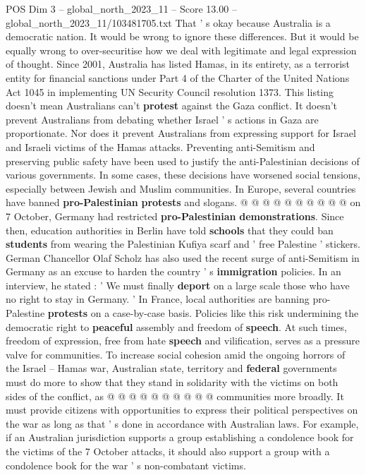 \begin{textsample}{POS Dim 3 – global\_north\_2023\_11 – Score 13.00 – global\_north\_2023\_11/103481705.txt}
That ' s okay because Australia is a democratic nation.
It would be wrong to ignore these differences.
But it would be equally wrong to over-securitise how we deal with legitimate and legal expression of thought.
Since 2001, Australia has listed Hamas, in its entirety, as a terrorist entity for financial sanctions under Part 4 of the Charter of the United Nations Act 1045 in implementing UN Security Council resolution 1373.
This listing doesn't mean Australians can't \textbf{protest} against the Gaza conflict.
It doesn't prevent Australians from debating whether Israel ' s actions in Gaza are proportionate.
Nor does it prevent Australians from expressing support for Israel and Israeli victims of the Hamas attacks.
Preventing anti-Semitism and preserving public safety have been used to justify the anti-Palestinian decisions of various governments.
In some cases, these decisions have worsened social tensions, especially between Jewish and Muslim communities.
In Europe, several countries have banned \textbf{pro-Palestinian} \textbf{protests} and slogans. @ @ @ @ @ @ @ @ @ @ on 7 October, Germany had restricted \textbf{pro-Palestinian} \textbf{demonstrations}.
Since then, education authorities in Berlin have told \textbf{schools} that they could ban \textbf{students} from wearing the Palestinian Kufiya scarf and ' free Palestine ' stickers.
German Chancellor Olaf Scholz has also used the recent surge of anti-Semitism in Germany as an excuse to harden the country ' s \textbf{immigration} policies.
In an interview, he stated : ' We must finally \textbf{deport} on a large scale those who have no right to stay in Germany. ' In France, local authorities are banning pro-Palestine \textbf{protests} on a case-by-case basis.
Policies like this risk undermining the democratic right to \textbf{peaceful} assembly and freedom of \textbf{speech}.
At such times, freedom of expression, free from hate \textbf{speech} and vilification, serves as a pressure valve for communities.
To increase social cohesion amid the ongoing horrors of the Israel -- Hamas war, Australian state, territory and \textbf{federal} governments must do more to show that they stand in solidarity with the victims on both sides of the conflict, as @ @ @ @ @ @ @ @ @ @ communities more broadly.
It must provide citizens with opportunities to express their political perspectives on the war as long as that ' s done in accordance with Australian laws.
For example, if an Australian jurisdiction supports a group establishing a condolence book for the victims of the 7 October attacks, it should also support a group with a condolence book for the war ' s non-combatant victims.

\end{textsample}
